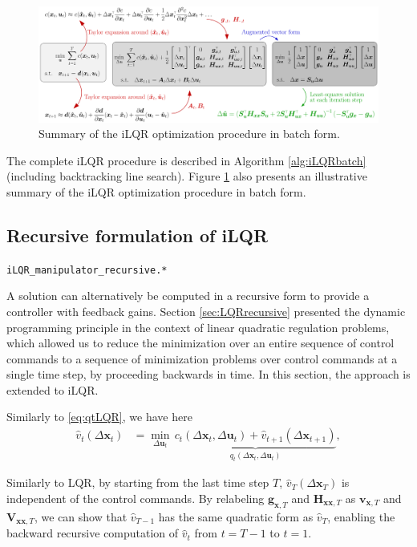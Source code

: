 \documentclass[10pt,a4paper]{article} %
\newcommand{\filename}[1]{\colorbox{rr2}{\color{white}\texttt{#1}}}
\begin{document}
\begin{figure}
\centering
\includegraphics[width=.9\columnwidth]{images/iLQR-eqs-overview01.png}
\caption{\footnotesize
Summary of the iLQR optimization procedure in batch form.
}
\label{fig:iLQR_summary}
\end{figure}

The complete iLQR procedure is described in Algorithm \ref{alg:iLQRbatch} (including backtracking line search). Figure \ref{fig:iLQR_summary} also presents an illustrative summary of the iLQR optimization procedure in batch form.



\subsection{Recursive formulation of iLQR}\label{sec:iLQRrecursive}
\begin{flushright}
\filename{iLQR\_manipulator\_recursive.*}
\end{flushright}

A solution can alternatively be computed in a recursive form to provide a controller with feedback gains. Section \ref{sec:LQRrecursive} presented the dynamic programming principle in the context of linear quadratic regulation problems, which allowed us to reduce the minimization over an entire sequence of control commands to a sequence of minimization problems over control commands at a single time step, by proceeding backwards in time. In this section, the approach is extended to iLQR. 

Similarly to \eqref{eq:qtLQR}, we have here
\begin{align}
	\hat{v}_t(\Delta\bm{x}_t) &= \min_{\Delta\bm{u}_t} \, \underbrace{c_t(\Delta\bm{x}_t,\Delta\bm{u}_t) + \hat{v}_{t+1}(\Delta\bm{x}_{t+1})}_{q_t(\Delta\bm{x}_t,\Delta\bm{u}_t)},
	\label{eq:qtiLQR}
\end{align}

Similarly to LQR, by starting from the last time step $T$, $\hat{v}_T(\Delta\bm{x}_T)$ is independent of the control commands. By relabeling $\bm{g}_{\bm{x},T}$ and $\bm{H}_{\bm{x}\bm{x},T}$ as $\bm{v}_{\bm{x},T}$ and $\bm{V}_{\bm{x}\bm{x},T}$, we can show that $\hat{v}_{T-1}$ has the same quadratic form as $\hat{v}_{T}$, enabling the backward recursive computation of $\hat{v}_{t}$ from $t=T-1$ to $t=1$.
\end{document}
